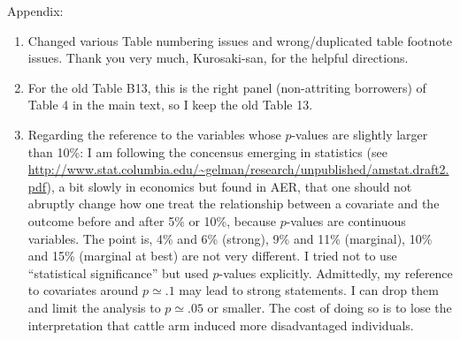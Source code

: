 Appendix:
\begin{enumerate}
\vspace{1.0ex}\setlength{\itemsep}{1.0ex}\setlength{\baselineskip}{12pt}
\item	Changed various Table numbering issues and wrong/duplicated table footnote issues. Thank you very much, Kurosaki-san, for the helpful directions. 
\item	For the old Table B13, this is the right panel (non-attriting borrowers) of Table 4 in the main text, so I keep the old Table 13.
\item	Regarding the reference to the variables whose $p$-values are slightly larger than 10\%: I am following the concensus emerging in statistics (see {\scriptsize \url{http://www.stat.columbia.edu/~gelman/research/unpublished/amstat.draft2.pdf}}), a bit slowly in economics but found in AER, that one should not abruptly change how one treat the relationship between a covariate and the outcome before and after 5\% or 10\%, because $p$-values are continuous variables. The point is, 4\% and 6\% (strong), 9\% and 11\% (marginal), 10\% and 15\% (marginal at best) are not very different. I tried not to use ``statistical significance'' but used $p$-values explicitly. Admittedly, my reference to covariates around $p\simeq .1$ may lead to strong statements. I can drop them and limit the analysis to $p\simeq .05$ or smaller. The cost of doing so is to lose the interpretation that cattle arm induced more disadvantaged individuals. 


\end{enumerate}
